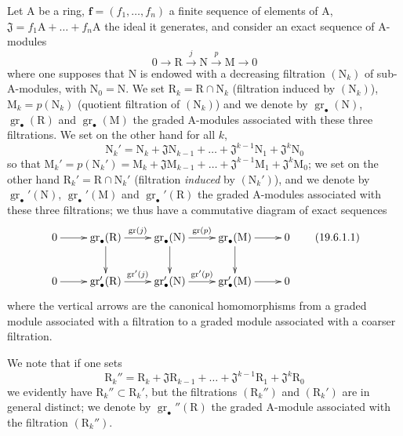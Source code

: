 \begin{env}[19.6.1]
\label{IV.19.6.1}
Let $\mathrm{A}$ be a ring, $\mathbf{f}=(f_1,\ldots,f_n)$ a finite sequence of elements of $\mathrm{A}$, $\mathfrak{J}=f_1\mathrm{A}+\ldots+f_n\mathrm{A}$ the ideal it generates, and consider an exact sequence of $\mathrm{A}$-modules
\[
  0\to\mathrm{R}\xrightarrow{j}\mathrm{N}\xrightarrow{p}\mathrm{M}\to 0
\]
where one supposes that $\mathrm{N}$ is endowed with a decreasing filtration $(\mathrm{N}_k)$ of sub-$\mathrm{A}$-modules, with $\mathrm{N}_0=\mathrm{N}$. We set $\mathrm{R}_k=\mathrm{R}\cap\mathrm{N}_k$ (filtration induced by $(\mathrm{N}_k)$), $\mathrm{M}_k=p(\mathrm{N}_k)$ (quotient filtration of $(\mathrm{N}_k)$) and we denote by $\operatorname{gr}_\bullet(\mathrm{N})$, $\operatorname{gr}_\bullet(\mathrm{R})$ and $\operatorname{gr}_\bullet(\mathrm{M})$ the graded $\mathrm{A}$-modules associated with these three filtrations. We set on the other hand for all $k$,
\[
  \mathrm{N}_k'=\mathrm{N}_k+\mathfrak{J}\mathrm{N}_{k-1}+\ldots+\mathfrak{J}^{k-1}\mathrm{N}_1+\mathfrak{J}^k\mathrm{N}_0
\]
so that $\mathrm{M}_k'=p(\mathrm{N}_k')=\mathrm{M}_k+\mathfrak{J}\mathrm{M}_{k-1}+\ldots+\mathfrak{J}^{k-1}\mathrm{M}_1+\mathfrak{J}^k\mathrm{M}_0$; we set on the other hand $\mathrm{R}_k'=\mathrm{R}\cap\mathrm{N}_k'$ (filtration \emph{induced} by $(\mathrm{N}_k')$), and we denote by $\operatorname{gr}_\bullet'(\mathrm{N})$, $\operatorname{gr}_\bullet'(\mathrm{M})$ and $\operatorname{gr}_\bullet'(\mathrm{R})$ the graded $\mathrm{A}$-modules associated with these three filtrations; we thus have a commutative diagram of exact sequences
\[
\xymatrix{
  0 \ar[r] & \operatorname{gr}_\bullet(\mathrm{R}) \ar[r]^-{\operatorname{gr}(j)} \ar[d] & \operatorname{gr}_\bullet(\mathrm{N}) \ar[r]^-{\operatorname{gr}(p)} \ar[d] & \operatorname{gr}_\bullet(\mathrm{M}) \ar[r] \ar[d] & 0 \\
  0 \ar[r] & \operatorname{gr}_\bullet'(\mathrm{R}) \ar[r]^-{\operatorname{gr}'(j)} & \operatorname{gr}_\bullet'(\mathrm{N}) \ar[r]^-{\operatorname{gr}'(p)} & \operatorname{gr}_\bullet'(\mathrm{M}) \ar[r] & 0
}
\tag{19.6.1.1}
\label{IV.19.6.1.1}
\]
where the vertical arrows are the canonical homomorphisms from a graded module associated with a filtration to a graded module associated with a coarser filtration.

We note that if one sets
\[
  \mathrm{R}_k''=\mathrm{R}_k+\mathfrak{J}\mathrm{R}_{k-1}+\ldots+\mathfrak{J}^{k-1}\mathrm{R}_1+\mathfrak{J}^k\mathrm{R}_0
\]
we evidently have $\mathrm{R}_k''\subset\mathrm{R}_k'$, but the filtrations $(\mathrm{R}_k'')$ and $(\mathrm{R}_k')$ are in general distinct; we denote by $\operatorname{gr}_\bullet''(\mathrm{R})$ the graded $\mathrm{A}$-module associated with the filtration $(\mathrm{R}_k'')$.
\end{env}


